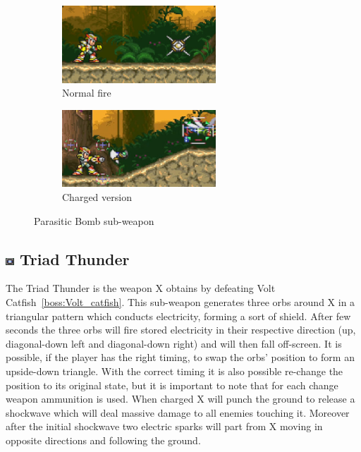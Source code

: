 \begin{figure}[htp]
	\centering
	\begin{subfigure}{.49\linewidth}
		\centering
		\includegraphics[height=2.9cm]{figures/X3/weapons/P_bomb.png}
		\caption{Normal fire}	
	\end{subfigure}
	\begin{subfigure}{.49\linewidth}
		\centering
		\includegraphics[height=2.9cm]{figures/X3/weapons/P_bomb_C.jpg}
		\caption{Charged version}	
	\end{subfigure}
	\caption{Parasitic Bomb sub-weapon}
\end{figure}


\subsection{\includegraphics[width=12px, height=10px]{figures/X3/weapons/T_thunder.jpg} Triad Thunder}\label{Triad_Thunder}

The Triad Thunder is the weapon X obtains by defeating Volt Catfish~\ref{boss:Volt_catfish}. This sub-weapon generates three orbs around X in a triangular pattern which conducts electricity, forming a sort of shield. After few seconds the three orbs will fire stored electricity in their respective direction (up, diagonal-down left and diagonal-down right) and will then fall off-screen. It is possible, if the player has the right timing, to swap the orbs' position to form an upside-down triangle. With the correct timing it is also possible re-change the position to its original state, but it is important to note that for each change weapon ammunition is used. When charged X will punch the ground to release a shockwave which will deal massive damage to all enemies touching it. Moreover after the initial shockwave two electric sparks will part from X moving in opposite directions and following the ground.

